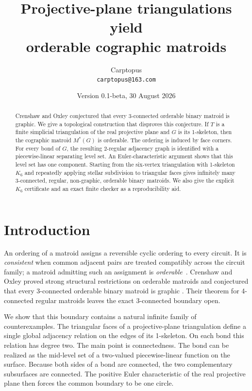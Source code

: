 \documentclass[11pt]{article}
\title{Projective-plane triangulations yield\\orderable cographic matroids}
\author{Carptopus\\\small\texttt{carptopus@163.com}}
\date{Version 0.1-beta, 30 August 2026}
\begin{document}
\maketitle

\begin{abstract}
Crenshaw and Oxley conjectured that every 3-connected orderable binary matroid
is graphic. We give a topological construction that disproves this conjecture.
If $T$ is a finite simplicial triangulation of the real projective plane and
$G$ is its 1-skeleton, then the cographic matroid $M^*(G)$ is orderable. The
ordering is induced by face corners. For every bond of $G$, the resulting
2-regular adjacency graph is identified with a piecewise-linear separating
level set. An Euler-characteristic argument shows that this level set has one
component. Starting from the six-vertex triangulation with 1-skeleton $K_6$
and repeatedly applying stellar subdivision to triangular faces gives
infinitely many 3-connected, regular, non-graphic, orderable binary matroids.
We also give the explicit $K_6$ certificate and an exact finite checker as a
reproducibility aid.
\end{abstract}

\section{Introduction}

An ordering of a matroid assigns a reversible cyclic ordering to every
circuit. It is \emph{consistent} when common adjacent pairs are treated
compatibly across the circuit family; a matroid admitting such an assignment
is \emph{orderable}~\cite{crenshaw-oxley}. Crenshaw and Oxley proved strong
structural restrictions on orderable matroids and conjectured that every
3-connected orderable binary matroid is graphic
\cite[Conjecture~4]{crenshaw-oxley}. Their theorem for 4-connected regular
matroids leaves the exact 3-connected boundary open.

We show that this boundary contains a natural infinite family of
counterexamples. The triangular faces of a projective-plane triangulation
define a single global adjacency relation on the edges of its 1-skeleton. On
each bond this relation has degree two. The main point is connectedness. The
bond can be realized as the mid-level set of a two-valued piecewise-linear
function on the surface. Because both sides of a bond are connected, the two
complementary subsurfaces are connected. The positive Euler characteristic of
the real projective plane then forces the common boundary to be one circle.
\end{document}
